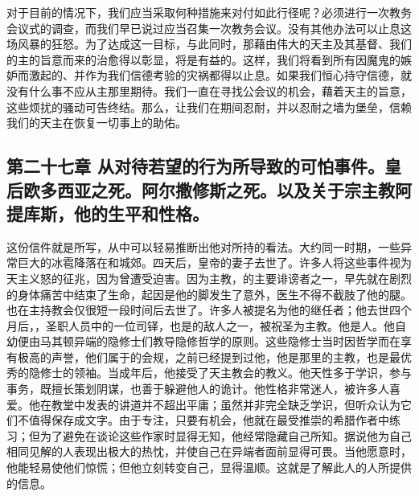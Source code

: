 对于目前的情况下，我们应当采取何种措施来对付如此行径呢？必须进行一次教务会议式的调查，而我们早已说过应当召集一次教务会议。没有其他办法可以止息这场风暴的狂怒。为了达成这一目标，与此同时，那藉由伟大的天主及其基督、我们的主的旨意而来的治愈得以彰显，将是有益的。这样，我们将看到所有因魔鬼的嫉妒而激起的、并作为我们信德考验的灾祸都得以止息。如果我们恒心持守信德，就没有什么事不应从主那里期待。我们一直在寻找公会议的机会，藉着天主的旨意，这些烦扰的骚动可告终结。那么，让我们在期间忍耐，并以忍耐之墙为堡垒，信赖我们的天主在恢复一切事上的助佑。\par

\par


\subsection{第二十七章 从对待若望的行为所导致的可怕事件。皇后欧多西亚之死。阿尔撒修斯之死。以及关于宗主教阿提库斯，他的生平和性格。}

这份信件就是所写，从中可以轻易推断出他对所持的看法。大约同一时期，一些异常巨大的冰雹降落在和城郊。四天后，皇帝的妻子去世了。许多人将这些事件视为天主义怒的征兆，因为曾遭受迫害。因为主教，的主要诽谤者之一，早先就在剧烈的身体痛苦中结束了生命，起因是他的脚发生了意外，医生不得不截肢了他的腿。也在主持教会仅很短一段时间后去世了。许多人被提名为他的继任者；他去世四个月后，，圣职人员中的一位司铎，也是的敌人之一，被祝圣为主教。他是人。他自幼便由马其顿异端的隐修士们教导隐修哲学的原则。这些隐修士当时因哲学而在享有极高的声誉，他们属于的会规，之前已经提到过他，他是那里的主教，也是最优秀的隐修士的领袖。当成年后，他接受了天主教会的教义。他天性多于学识，参与事务，既擅长策划阴谋，也善于躲避他人的诡计。他性格非常迷人，被许多人喜爱。他在教堂中发表的讲道并不超出平庸；虽然并非完全缺乏学识，但听众认为它们不值得保存成文字。由于专注，只要有机会，他就在最受推崇的希腊作者中练习；但为了避免在谈论这些作家时显得无知，他经常隐藏自己所知。据说他为自己相同见解的人表现出极大的热忱，并使自己在异端者面前显得可畏。当他愿意时，他能轻易使他们惊慌；但他立刻转变自己，显得温顺。这就是了解此人的人所提供的信息。\par

